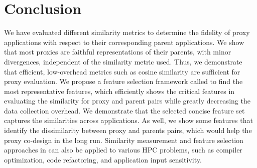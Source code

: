\section{Conclusion}
\label{sec:conclusion}
We have evaluated different similarity metrics to determine the fidelity of proxy applications with respect to their corresponding parent applications.
%
We show that most proxies are faithful representations of their parents, with minor divergences, independent of the similarity metric used.  Thus, we demonstrate that efficient, low-overhead metrics such as cosine similarity are sufficient for proxy evaluation.
%
We propose a feature selection framework called \us to find the most representative features, which efficiently shows the critical features in evaluating the similarity for proxy and parent pairs while greatly decreasing the data collection overhead. 
%
We demonstrate that the selected concise feature set captures the similarities across applications.
%
As well, we show some features that identify the dissimilarity between proxy and parents pairs, which would help the proxy co-design in the long run.
%
Similarity measurement and feature selection approaches in \us can also be applied to various HPC problems, such as compiler optimization, code refactoring, and application input sensitivity.
